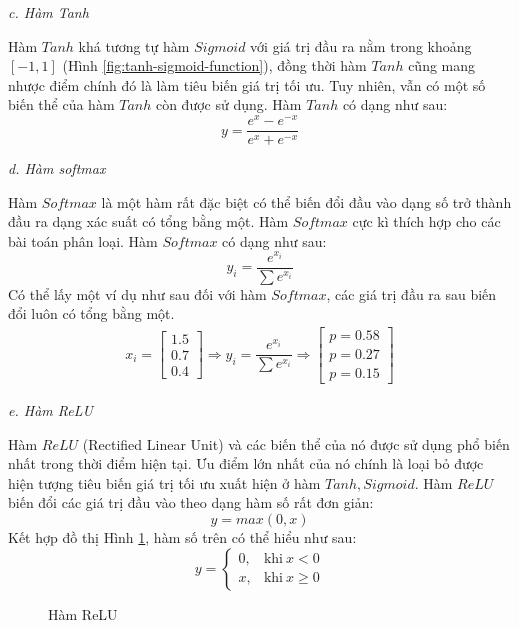 \documentclass[12pt,a4paper]{report}
\begin{document}
\textit{c. Hàm Tanh}

Hàm $Tanh$ khá tương tự hàm $Sigmoid$ với giá trị đầu ra nằm trong khoảng $[-1, 1]$ (Hình \ref{fig:tanh-sigmoid-function}), đồng thời hàm $Tanh$ cũng mang nhược điểm chính đó là làm tiêu biến giá trị tối ưu. Tuy nhiên, vẫn có một số biến thể của hàm $Tanh$ còn được sử dụng. Hàm $Tanh$ có dạng như sau:
	\begin{equation}
		y = \dfrac{e^x - e^{-x}}{e^x + e^{-x}}
	\end{equation}

\textit{d. Hàm softmax}

Hàm $Softmax$ là một hàm rất đặc biệt có thể biến đổi đầu vào dạng số trở thành đầu ra dạng xác suất có tổng bằng một. Hàm $Softmax$ cực kì thích hợp cho các bài toán phân loại. Hàm $Softmax$ có dạng như sau:
	\begin{equation}
		y_i = \dfrac{e^{x_i}}{\sum e^{x_i}}
	\end{equation}
Có thể lấy một ví dụ như sau đối với hàm $Softmax$, các giá trị đầu ra sau biến đổi luôn có tổng bằng một.
	\begin{align}
		x_i = 
	    \begin{bmatrix}
	        1.5 \\
	        0.7 \\
	        0.4
	    \end{bmatrix} \Longrightarrow
	    y_i = \dfrac{e^{x_i}}{\sum e^{x_i}} \Longrightarrow
	    \begin{bmatrix}
	        p = 0.58 \\
	        p = 0.27 \\
	        p = 0.15
	    \end{bmatrix}
	\end{align}

\textit{e. Hàm ReLU}

Hàm $ReLU$ (Rectified Linear Unit) và các biến thể của nó được sử dụng phổ biến nhất trong thời điểm hiện tại. Ưu điểm lớn nhất của nó chính là loại bỏ được hiện tượng tiêu biến giá trị tối ưu xuất hiện ở hàm $Tanh, Sigmoid$. Hàm $ReLU$ biến đổi các giá trị đầu vào theo dạng hàm số rất đơn giản:
	\begin{equation}
		y = max(0, x)
	\end{equation}
Kết hợp đồ thị Hình \ref{fig:relu-function}, hàm số trên có thể hiểu như sau:
	\begin{equation}
  		y =
		    \begin{cases}
		      0, & \text{khi}\ x < 0 \\
		      x, & \text{khi}\ x \geq 0
		    \end{cases}
	\end{equation}
	\begin{figure}[h]
	    \centering
	    \caption{Hàm ReLU}
	    \label{fig:relu-function}
	\end{figure}
\end{document}
